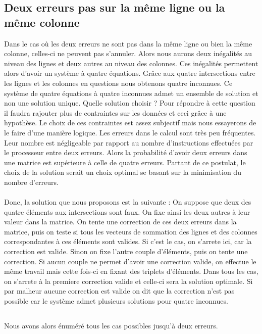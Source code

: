 \documentclass[a4paper, 10pt]{report}
\begin{document}
\subsection{Deux erreurs pas sur la même ligne ou la même colonne}
Dans le cas où les deux erreurs ne sont pas dans la même ligne ou bien la même colonne, celles-ci ne peuvent pas s’annuler. 
Alors nous aurons deux inégalités au niveau des lignes et deux autres au niveau des colonnes. Ces inégalités permettent 
alors d’avoir un système à quatre équations. Grâce aux quatre intersections entre les lignes et les colonnes en questions 
nous obtenons quatre inconnues.\newline
Ce système de quatre équations à quatre inconnues admet un ensemble de solution et non une solution unique. Quelle solution 
choisir ? Pour répondre à cette question il faudra rajouter plus de contraintes sur les données et ceci grâce à une hypothèse. 
Le choix de ces contraintes est assez subjectif mais nous essayerons de le faire d’une manière logique.
Les erreurs dans le calcul sont très peu fréquentes. Leur nombre est négligeable par rapport au nombre d’instructions 
effectuées par le processeur entre deux erreurs. Alors la probabilité d’avoir deux erreurs dans une matrice est supérieure 
à celle de quatre erreurs. Partant de ce postulat, le choix de la solution serait un choix optimal se basant sur la 
minimisation du nombre d’erreurs.
\paragraph*{}
Donc, la solution que nous proposons est la suivante :\newline
On suppose que deux des quatre éléments aux intersections sont faux. On fixe ainsi les deux autres à leur valeur dans 
la matrice. On tente une correction de ces deux erreurs dans la matrice, puis on teste si tous les vecteurs de sommation 
des lignes et des colonnes correspondantes à ces éléments sont valides. Si c'est le cas, on s'arrete ici, car la correction
est valide. Sinon on fixe l'autre couple d'éléments, puis on tente une correction. Si aucun couple ne permet d'avoir une 
correction valide, on effectue le même travail mais cette fois-ci en fixant des triplets d'éléments. Dans tous les cas, on 
s'arrete à la premiere correction valide et celle-ci sera la solution optimale.
Si par malheur aucune correction est valide on dit que la correction n'est pas possible car le système admet plusieurs solutions 
pour quatre inconnues.

\subsection*{}
Nous avons alors énuméré tous les cas possibles jusqu'à deux erreurs.
\end{document}
